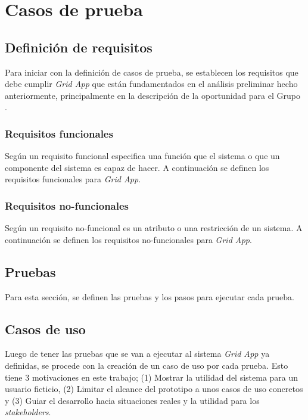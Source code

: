 \section{Casos de prueba}
\noindent

\subsection{Definición de requisitos}
\noindent
Para iniciar con la definición de casos de prueba, se establecen los requisitos que debe cumplir \textit{Grid App} que están fundamentados en el análisis preliminar hecho anteriormente, principalmente en la descripción de la oportunidad para el Grupo \GRID.

\subsubsection{Requisitos funcionales}
\noindent
Según \cite{159342} un requisito funcional especifica una función que el sistema o que un componente del sistema es capaz de hacer. A continuación se definen los requisitos funcionales para \textit{Grid App}.


\subsubsection{Requisitos no-funcionales}
\noindent
Según \cite{4384163} un requisito no-funcional es un atributo o una restricción de un sistema. A continuación se definen los requisitos no-funcionales para \textit{Grid App}.


\subsection{Pruebas}
\noindent
Para esta sección, se definen las pruebas y los pasos para ejecutar cada prueba.


\subsection{Casos de uso}
\noindent
Luego de tener las pruebas que se van a ejecutar al sistema \textit{Grid App} ya definidas, se procede con la creación de un caso de uso por cada prueba. Esto tiene 3 motivaciones en este trabajo; (1) Mostrar la utilidad del sistema para un usuario ficticio, (2) Limitar el alcance del prototipo a unos casos de uso concretos y (3) Guiar el desarrollo hacia situaciones reales y la utilidad para los \textit{stakeholders}.

